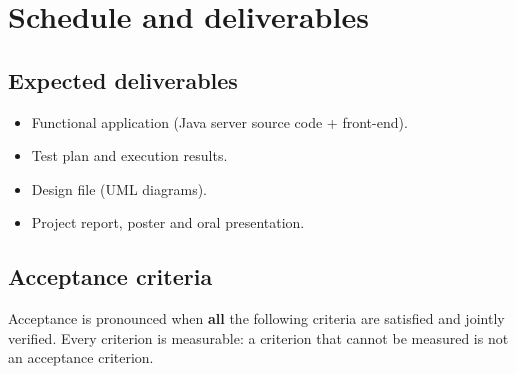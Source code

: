 \chapter{Schedule and deliverables}
\label{chap:delais}

\section{Expected deliverables}
\begin{itemize}
  \item Functional application (Java server source code + front-end).
  \item Test plan and execution results.
  \item Design file (UML diagrams).
  \item Project report, poster and oral presentation.
\end{itemize}

\section{Acceptance criteria}
Acceptance is pronounced when \textbf{all} the following criteria are satisfied
and jointly verified. Every criterion is measurable: a criterion that cannot be
measured is not an acceptance criterion.

